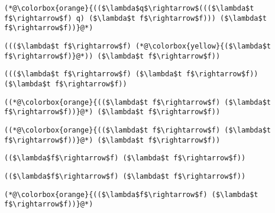 \documentclass{beamer}
\begin{document}
\begin{frame}[fragile]{\CurrentSection}
\lstset{basicstyle=\ttfamily\small}\lstset{numbers=none}\lstset{language=ML}\begin{lstlisting}
(*@\colorbox{orange}{(($\lambda$q$\rightarrow$((($\lambda$t f$\rightarrow$f) q) ($\lambda$t f$\rightarrow$f))) ($\lambda$t f$\rightarrow$f))}@*)
\end{lstlisting}
\pause\lstset{language=ML}\begin{lstlisting}
((($\lambda$t f$\rightarrow$f) (*@\colorbox{yellow}{($\lambda$t f$\rightarrow$f)}@*)) ($\lambda$t f$\rightarrow$f))
\end{lstlisting}

\end{frame}

\begin{frame}[fragile]{\CurrentSection}
\lstset{basicstyle=\ttfamily\small}\lstset{numbers=none}\lstset{language=ML}\begin{lstlisting}
((($\lambda$t f$\rightarrow$f) ($\lambda$t f$\rightarrow$f)) ($\lambda$t f$\rightarrow$f))
\end{lstlisting}
\pause\lstset{language=ML}\begin{lstlisting}
((*@\colorbox{orange}{(($\lambda$t f$\rightarrow$f) ($\lambda$t f$\rightarrow$f))}@*) ($\lambda$t f$\rightarrow$f))
\end{lstlisting}

\end{frame}

\begin{frame}[fragile]{\CurrentSection}
\lstset{basicstyle=\ttfamily\small}\lstset{numbers=none}\lstset{language=ML}\begin{lstlisting}
((*@\colorbox{orange}{(($\lambda$t f$\rightarrow$f) ($\lambda$t f$\rightarrow$f))}@*) ($\lambda$t f$\rightarrow$f))
\end{lstlisting}
\pause\lstset{language=ML}\begin{lstlisting}
(($\lambda$f$\rightarrow$f) ($\lambda$t f$\rightarrow$f))
\end{lstlisting}

\end{frame}

\begin{frame}[fragile]{\CurrentSection}
\lstset{basicstyle=\ttfamily\small}\lstset{numbers=none}\lstset{language=ML}\begin{lstlisting}
(($\lambda$f$\rightarrow$f) ($\lambda$t f$\rightarrow$f))
\end{lstlisting}
\pause\lstset{language=ML}\begin{lstlisting}
(*@\colorbox{orange}{(($\lambda$f$\rightarrow$f) ($\lambda$t f$\rightarrow$f))}@*)
\end{lstlisting}

\end{frame}
\end{document}
